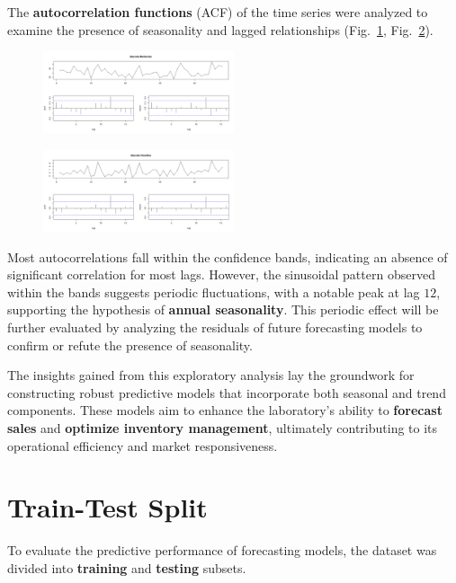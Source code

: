 \documentclass[10pt,twocolumn,letterpaper]{article}
\begin{document}
The \textbf{autocorrelation functions} (ACF) of the time series were analyzed to examine the presence of seasonality and lagged relationships (Fig.~\ref{fig:ACF_MAN}, Fig.~\ref{fig:ACF_VIC}).
\begin{figure}[h!]
    \centering
    \includegraphics[width=0.5\textwidth]{PlotsBEFD/ACF_MAN.png} 
    \caption{}
    \label{fig:ACF_MAN}
\end{figure}
\begin{figure}[h!]
    \centering
    \includegraphics[width=0.5\textwidth]{PlotsBEFD/ACF_VIC.png} 
    \caption{}
    \label{fig:ACF_VIC}
\end{figure}

Most autocorrelations fall within the confidence bands, indicating an absence of significant correlation for most lags. However, the sinusoidal pattern observed within the bands suggests periodic fluctuations, with a notable peak at lag $12$, supporting the hypothesis of \textbf{annual seasonality}. This periodic effect will be further evaluated by analyzing the residuals of future forecasting models to confirm or refute the presence of seasonality.

The insights gained from this exploratory analysis lay the groundwork for constructing robust predictive models that incorporate both seasonal and trend components. These models aim to enhance the laboratory's ability to \textbf{forecast sales} and \textbf{optimize inventory management}, ultimately contributing to its operational efficiency and market responsiveness.

\section{Train-Test Split}
To evaluate the predictive performance of forecasting models, the dataset was divided into \textbf{training} and \textbf{testing} subsets.
\end{document}

